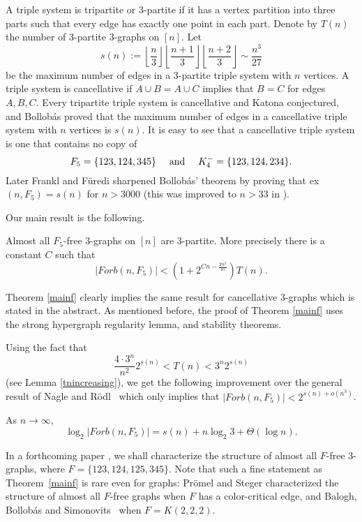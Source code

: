 \documentclass[11pt]{article}
\begin{document}
A triple system is tripartite or $3$-partite if it has a vertex
partition into three parts such that every  edge has exactly one
point in each part. Denote by $T(n)$  the number of $3$-partite
$3$-graphs on $[n]$.  Let
$$s(n):=
\left\lfloor\frac{n}{3}\right
\rfloor \left\lfloor\frac{n+1}{3}\right\rfloor
\left\lfloor\frac{n+2}{3}\right\rfloor\sim \frac{n^3}{27}$$
be the  maximum number
  of edges in a $3$-partite triple system with $n$ vertices. A triple system is cancellative if  $A \cup B = A \cup C$ implies that $B=C$ for edges $A,B,C$.
 Every tripartite triple system is cancellative and Katona conjectured, and Bollob\'as \cite{bollobas:74}
  proved that the maximum number of edges in a cancellative triple system with $n$ vertices is $s(n)$.
It is easy to see that a cancellative triple system is one that contains no copy of
$$F_5=\{123, 124, 345\} \quad \hbox{ and } \quad
K_4^-=\{123, 124, 234\}.$$ Later Frankl and F\"uredi \cite{frankl+furedi:83} sharpened Bollob\'as'
 theorem by proving that ex$(n, F_5)=s(n)$ for $n>3000$ (this was improved to $n>33$ in \cite{KM}).


Our main result is the following.

\begin{theorem}\label{mainf}
Almost all $F_5$-free $3$-graphs on $[n]$ are $3$-partite. More
precisely there is a constant $C$ such that
\begin{equation}\label{induction}
|Forb(n,F_5)|< \left(1+ 2^{Cn-\frac{2n^2}{45}}\right) T(n).\end{equation}
\end{theorem}


Theorem \ref{mainf}  clearly implies the same result for
cancellative $3$-graphs which is stated in the abstract.
As
mentioned before, the proof of Theorem \ref{mainf} uses the strong
hypergraph regularity lemma, and stability theorems.

Using the fact that
$$\frac{4\cdot 3^n}{n^2} 2^{s(n)}<T(n)<3^n2^{s(n)}$$ (see Lemma \ref{tnincreasing}), we get the following improvement over the general result  of
 Nagle and R\"odl~\cite{NR} which only implies that
$|Forb(n,F_5)|<2^{s(n)+o(n^3)}$.

\begin{corollary} As $n \rightarrow \infty$,
$$\log_2|Forb(n,F_5)|=s(n)+n\log_2 3 +\Theta(\log n).$$
\end{corollary}
 In a
forthcoming paper \cite{t5}, we shall characterize the structure of
almost all $F$-free $3$-graphs, where $F=\{123,124,125,345\}$.  Note
that such a fine statement as Theorem~\ref{mainf} is rare even for
graphs: Pr\"omel and Steger \cite{PS1} characterized the structure
of almost all $F$-free graphs when $F$ has a color-critical edge,
and Balogh, Bollob\'as and Simonovits~\cite {BBS3} when
$F=K(2,2,2)$.
\end{document}
